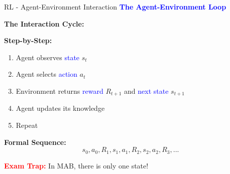 \documentclass[8pt]{beamer}
\begin{document}
\begin{frame}{RL - Agent-Environment Interaction}
\fontsize{6.5}{7.5}\selectfont
\textcolor{blue}{\textbf{The Agent-Environment Loop}}

\textbf{The Interaction Cycle:}
\begin{center}
\end{center}

\textbf{Step-by-Step:}
\begin{enumerate}
\item Agent observes \textcolor{blue}{state} $s_t$
\item Agent selects \textcolor{blue}{action} $a_t$
\item Environment returns \textcolor{blue}{reward} $R_{t+1}$ and \textcolor{blue}{next state} $s_{t+1}$
\item Agent updates its knowledge
\item Repeat
\end{enumerate}

\textbf{Formal Sequence:}
\[
s_0, a_0, R_1, s_1, a_1, R_2, s_2, a_2, R_3, ...
\]

\textcolor{red}{\textbf{Exam Trap:}} In MAB, there is only one state!
\end{frame}
\end{document}

